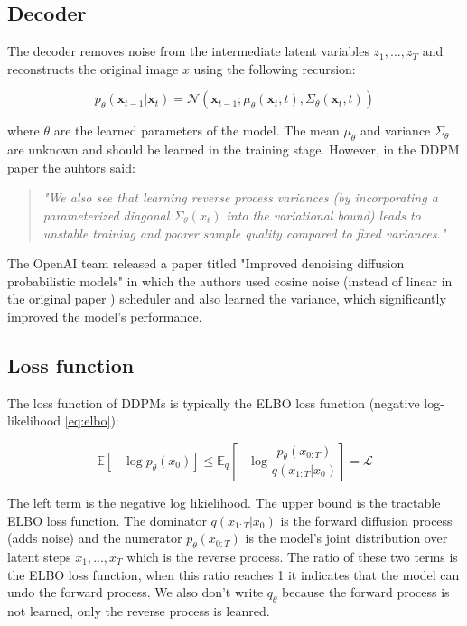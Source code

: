 \subsection{Decoder}

The decoder removes noise from the intermediate latent variables $z_1, ..., z_T$ and reconstructs the original image $x$ using the following recursion:

\begin{equation}
    p_\theta(\mathbf{x}_{t-1} | \mathbf{x}_t) = \mathcal{N}(\mathbf{x}_{t-1}; \mu_\theta(\mathbf{x}_t, t), \Sigma_\theta(\mathbf{x}_t, t))
    \label{eq:reverse_diffusion}
\end{equation}

where $\theta$ are the learned parameters of the model. The mean $\mu_\theta$ and variance $\Sigma_\theta$ are unknown and should be learned in the training stage. However, in the DDPM paper \cite{ddpm} the auhtors said:

\begin{quote}
    \textit{"We also see that learning reverse process variances (by incorporating a parameterized diagonal $\Sigma_\theta(x_t)$ into the variational bound) leads to unstable training and poorer sample quality compared to fixed variances."} \cite{ddpm}
\end{quote}

The OpenAI team released a paper titled "Improved denoising diffusion probabilistic models" \cite{openai_improved_ddpm} in which the authors used cosine noise (instead of linear in the original paper \cite{ddpm}) scheduler and also learned the variance, which significantly improved the model's performance.








\subsection{Loss function}

The loss function of DDPMs is typically the ELBO loss function (negative log-likelihood \ref{eq:elbo}):

\begin{equation*}
    \mathbb{E}[-\log p_\theta (x_0)] \leq \mathbb{E}_q[-\log \frac{p_\theta(x_{0:T})}{q(x_{1:T}|x_0)}] = \mathcal{L}
\end{equation*}

The left term is the negative log likielihood. The upper bound is the tractable ELBO loss function. The dominator $q(x_{1:T}|x_0)$ is the forward diffusion process (adds noise) and the numerator $p_\theta(x_{0:T})$ is the model's joint distribution over latent steps $x_1, ..., x_T$ which is the reverse process. The ratio of these two terms is the ELBO loss function, when this ratio reaches 1 it indicates that the model can undo the forward process. We also don't write $q_\theta$ because the forward process is not learned, only the reverse process is leanred.


